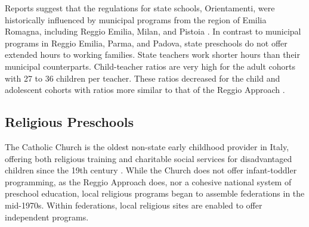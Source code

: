 %

Reports suggest that the regulations for state schools, Orientamenti, were historically influenced by municipal programs from the region of Emilia Romagna, including Reggio Emilia, Milan, and Pistoia \citep{OECD_2001_Italy-Country-Note}. In contrast to municipal programs in Reggio Emilia, Parma, and Padova, state preschools do not offer extended hours to working families. State teachers work shorter hours than their municipal counterparts. Child-teacher ratios are very high for the adult cohorts with 27 to 36 children per teacher. These ratios decreased for the child and adolescent cohorts with ratios more similar to that of the Reggio Approach \citep{Hohnerlein_2015_Development-and-Diffusion}. 


\subsection{Religious Preschools}

The Catholic Church is the oldest non-state early childhood provider in Italy, offering both religious training and charitable social services for disadvantaged children since the 19th century \citep{OECD_2001_Italy-Country-Note}. While the Church does not offer infant-toddler programming, as the Reggio Approach does, nor a cohesive national system of preschool education, local religious programs began to assemble federations in the mid-1970s. Within federations, local religious sites are enabled to offer independent programs. 

